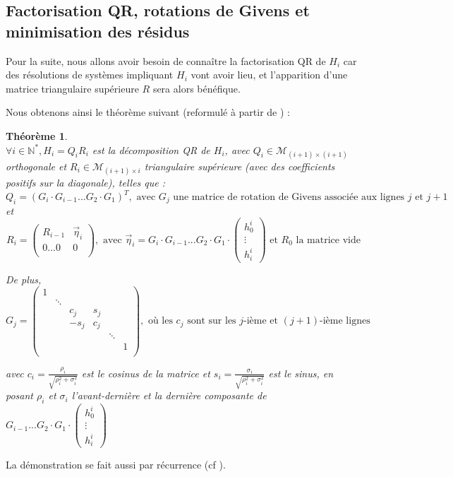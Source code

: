 \documentclass[11pt,a4paper,oneside]{memoir}
\newcommand{\N}{\mathbb{N}}	\newcommand{\Z}{\mathbb{Z}}
\theoremstyle{definition}
\theoremstyle{remark}
\theoremstyle{plain}
\newtheorem{theorem}{{Théorème}}
\begin{document}
\subsection{Factorisation QR, rotations de Givens et minimisation des résidus}

Pour la suite, nous allons avoir besoin de connaître la factorisation QR de $H_i$ car des résolutions de systèmes impliquant $H_i$ vont avoir lieu, et l'apparition d'une matrice triangulaire supérieure $R$ sera alors bénéfique.

Nous obtenons ainsi le théorème suivant (reformulé à partir de \cite{gmres_wikipedia}) :

\begin{theorem}
~\\
$\forall i \in \N^*, H_i = Q_i R_i$
est la décomposition QR de $H_i$, avec $Q_i \in \mathcal{M}_{(i+1)\times(i+1)}$ orthogonale et $R_i \in \mathcal{M}_{(i+1)\times i}$ triangulaire supérieure (avec des coefficients positifs sur la diagonale), telles que :
\[
Q_i = (G_i \cdot G_{i-1} ... G_2 \cdot G_1)^T, \text{ avec $G_j$ une matrice de rotation de Givens associée aux lignes $j$ et $j+1$}
\]
et
\[
R_i = \left( \begin{matrix}
R_{i-1} & \vec{\eta}_i \\
0 ... 0 & 0 \\
\end{matrix} \right), \text{ avec } \vec{\eta}_i = G_i \cdot G_{i-1} ... G_2 \cdot G_1 \cdot \left( \begin{matrix}
h_0^i \\
\vdots \\
h_i^i
\end{matrix} \right) \text{ et $R_0$ la matrice vide}
\]

De plus,
\[
G_j = \left( \begin{matrix}
1 \\
 & \ddots \\
 &       & c_j    & s_j \\
 &       & -s_j   & c_j \\
 &       &        &     & \ddots \\
 &       &        &     &       & 1 \\
\end{matrix} \right), \text{ où les $c_j$ sont sur les $j$-ième et $(j+1)$-ième lignes}
\]

avec $c_i = \frac{\rho_i}{\sqrt{\rho_i^2 + \sigma_i^2}}$ est le cosinus de la matrice et $s_i = \frac{\sigma_i}{\sqrt{\rho_i^2 + \sigma_i^2}}$ est le sinus, en posant $\rho_i$ et $\sigma_i$ l'avant-dernière et la dernière composante de $G_{i-1} ... G_2 \cdot G_1 \cdot \left( \begin{matrix}
h_0^i \\
\vdots \\
h_i^i
\end{matrix} \right)$
\end{theorem}
\noindent La démonstration se fait aussi par récurrence (cf \cite{gmres_wikipedia}).\medskip
\end{document}
